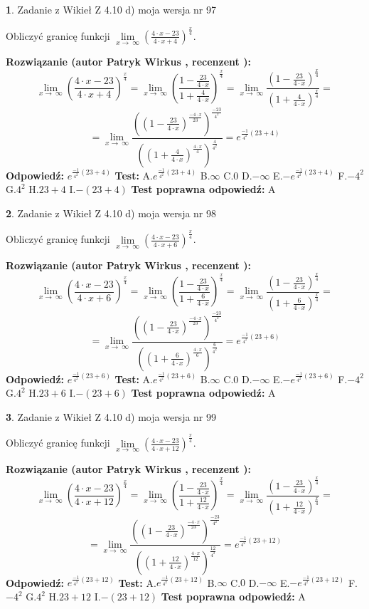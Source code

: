 \documentclass[12pt, a4paper]{article}
\theoremstyle{definition} %
\newtheorem{zad}{}
\newcommand{\zadStart}[1]{\begin{zad}#1\newline}
\newcommand{\zadStop}{\end{zad}}
\newcommand{\rozwStart}[2]{\noindent \textbf{Rozwiązanie (autor #1 , recenzent #2): }\newline}
\newcommand{\rozwStop}{\newline}
\newcommand{\odpStart}{\noindent \textbf{Odpowiedź:}\newline}
\newcommand{\odpStop}{\newline}
\newcommand{\testStart}{\noindent \textbf{Test:}\newline}
\newcommand{\testStop}{\newline}
\newcommand{\kluczStart}{\noindent \textbf{Test poprawna odpowiedź:}\newline}
\newcommand{\kluczStop}{\newline}
\begin{document}
\zadStart{Zadanie z Wikieł Z 4.10 d) moja wersja nr 97}


Obliczyć granicę funkcji  $\lim\limits_{x\to\ \infty}(\frac{4\cdot x-23}{4\cdot x+4})^{\frac{x}{4}}$.
\zadStop
\rozwStart{Patryk Wirkus}{}
$$\lim\limits_{x\to\ \infty}(\frac{4\cdot x-23}{4\cdot x+4})^{\frac{x}{4}} = \lim\limits_{x\to\ \infty}(\frac{1-\frac{23}{4\cdot x}}{1+\frac{4}{4\cdot x}})^{\frac{x}{4}}=\lim\limits_{x\to\ \infty}\frac{(1-\frac{23}{4\cdot x})^{\frac{x}{4}}}{(1+\frac{4}{4\cdot x})^{\frac{x}{4}}}=$$
$$=\lim\limits_{x\to\ \infty}\frac{((1-\frac{23}{4\cdot x})^{\frac{-4\cdot x}{23}})^{\frac{-23}{4^{2}}}}{((1+\frac{4}{4\cdot x})^{\frac{4\cdot x}{4}})^{\frac{4}{4^{2}}}}=e^{\frac{-1}{4^{2}}(23+4)}$$
\rozwStop
\odpStart
$e^{\frac{-1}{4^{2}}(23+4)}$
\odpStop
\testStart
A.$e^{\frac{-1}{4^{2}}(23+4)}$ B.$\infty$ C.$0$ D.$-\infty$ E.$-e^{\frac{-1}{4^{2}}(23+4)}$
F.$-4^{2}$ G.$4^{2}$
H.$23+4$
I.$-(23+4)$
\testStop
\kluczStart
A
\kluczStop



\zadStart{Zadanie z Wikieł Z 4.10 d) moja wersja nr 98}


Obliczyć granicę funkcji  $\lim\limits_{x\to\ \infty}(\frac{4\cdot x-23}{4\cdot x+6})^{\frac{x}{4}}$.
\zadStop
\rozwStart{Patryk Wirkus}{}
$$\lim\limits_{x\to\ \infty}(\frac{4\cdot x-23}{4\cdot x+6})^{\frac{x}{4}} = \lim\limits_{x\to\ \infty}(\frac{1-\frac{23}{4\cdot x}}{1+\frac{6}{4\cdot x}})^{\frac{x}{4}}=\lim\limits_{x\to\ \infty}\frac{(1-\frac{23}{4\cdot x})^{\frac{x}{4}}}{(1+\frac{6}{4\cdot x})^{\frac{x}{4}}}=$$
$$=\lim\limits_{x\to\ \infty}\frac{((1-\frac{23}{4\cdot x})^{\frac{-4\cdot x}{23}})^{\frac{-23}{4^{2}}}}{((1+\frac{6}{4\cdot x})^{\frac{4\cdot x}{6}})^{\frac{6}{4^{2}}}}=e^{\frac{-1}{4^{2}}(23+6)}$$
\rozwStop
\odpStart
$e^{\frac{-1}{4^{2}}(23+6)}$
\odpStop
\testStart
A.$e^{\frac{-1}{4^{2}}(23+6)}$ B.$\infty$ C.$0$ D.$-\infty$ E.$-e^{\frac{-1}{4^{2}}(23+6)}$
F.$-4^{2}$ G.$4^{2}$
H.$23+6$
I.$-(23+6)$
\testStop
\kluczStart
A
\kluczStop



\zadStart{Zadanie z Wikieł Z 4.10 d) moja wersja nr 99}


Obliczyć granicę funkcji  $\lim\limits_{x\to\ \infty}(\frac{4\cdot x-23}{4\cdot x+12})^{\frac{x}{4}}$.
\zadStop
\rozwStart{Patryk Wirkus}{}
$$\lim\limits_{x\to\ \infty}(\frac{4\cdot x-23}{4\cdot x+12})^{\frac{x}{4}} = \lim\limits_{x\to\ \infty}(\frac{1-\frac{23}{4\cdot x}}{1+\frac{12}{4\cdot x}})^{\frac{x}{4}}=\lim\limits_{x\to\ \infty}\frac{(1-\frac{23}{4\cdot x})^{\frac{x}{4}}}{(1+\frac{12}{4\cdot x})^{\frac{x}{4}}}=$$
$$=\lim\limits_{x\to\ \infty}\frac{((1-\frac{23}{4\cdot x})^{\frac{-4\cdot x}{23}})^{\frac{-23}{4^{2}}}}{((1+\frac{12}{4\cdot x})^{\frac{4\cdot x}{12}})^{\frac{12}{4^{2}}}}=e^{\frac{-1}{4^{2}}(23+12)}$$
\rozwStop
\odpStart
$e^{\frac{-1}{4^{2}}(23+12)}$
\odpStop
\testStart
A.$e^{\frac{-1}{4^{2}}(23+12)}$ B.$\infty$ C.$0$ D.$-\infty$ E.$-e^{\frac{-1}{4^{2}}(23+12)}$
F.$-4^{2}$ G.$4^{2}$
H.$23+12$
I.$-(23+12)$
\testStop
\kluczStart
A
\kluczStop
\end{document}
